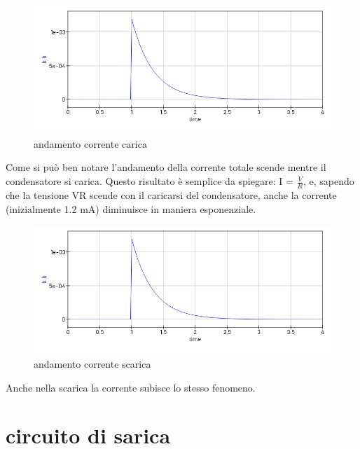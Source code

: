 \documentclass[12pt]{article}
\begin{document}
\begin{figure}[h!]
  \includegraphics[width=\linewidth]{data/carica-IT.png}
  \caption*{andamento corrente carica}
\end{figure}

Come si può ben notare l'andamento della corrente totale scende mentre il condensatore si carica. Questo risultato è semplice da spiegare: I = $\frac{V}{R}$, e, sapendo che la tensione VR scende con il caricarsi del condensatore, anche la corrente (inizialmente 1.2 mA) diminuisce in maniera esponenziale. 

\begin{figure}[h!]
  \includegraphics[width=\linewidth]{data/scarica-IT.png}
  \caption*{andamento corrente scarica}
\end{figure}

Anche nella scarica la corrente subisce lo stesso fenomeno.


\newpage
\section*{circuito di sarica}
\end{document}
